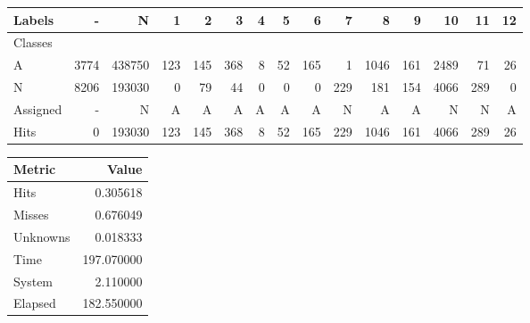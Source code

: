 \begin{tabular}{l|r|r|r|r|r|r|r|r|r|r|r|r|r|r}

Labels &     - &       N &    1 &    2 &    3 &  4 &   5 &    6 &    7 &     8 &    9 &    10 &   11 &  12 \\\hline
Classes  &       &         &      &      &      &    &     &      &      &       &      &       &      &     \\\hline
\hline
A        &  3774 &  438750 &  123 &  145 &  368 &  8 &  52 &  165 &    1 &  1046 &  161 &  2489 &   71 &  26 \\\hline
N        &  8206 &  193030 &    0 &   79 &   44 &  0 &   0 &    0 &  229 &   181 &  154 &  4066 &  289 &   0 \\\hline
\hline
Assigned &     - &       N &    A &    A &    A &  A &   A &    A &    N &     A &    A &     N &    N &   A \\\hline
Hits     &     0 &  193030 &  123 &  145 &  368 &  8 &  52 &  165 &  229 &  1046 &  161 &  4066 &  289 &  26 
\end{tabular}
\begin{tabular}{l|r}

Metric   &       Value \\\hline
\hline
Hits     &    0.305618 \\\hline
Misses   &    0.676049 \\\hline
Unknowns &    0.018333 \\\hline
Time     &  197.070000 \\\hline
System   &    2.110000 \\\hline
Elapsed  &  182.550000 
\end{tabular}
